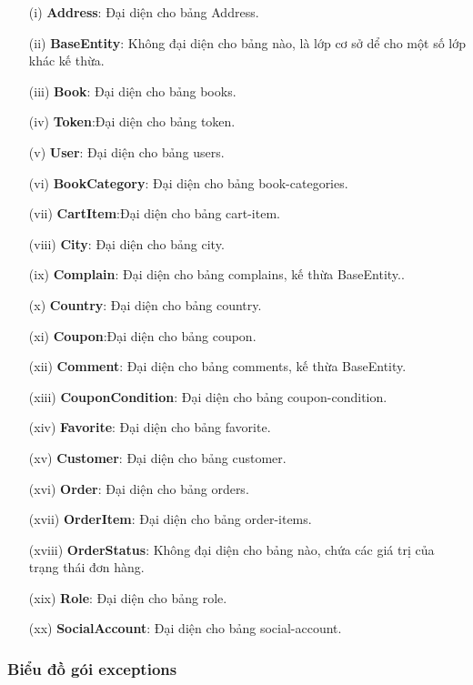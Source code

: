 \documentclass[../DoAn.tex]{subfiles}
\begin{document}
\begin{enumerate}
    \item [(i)] \textbf{Address}: Đại diện cho bảng Address.
    \item [(ii)]\textbf{BaseEntity}: Không đại diện cho bảng nào, là lớp cơ sở dể cho một số lớp khác kế thừa.
    \item[(iii)] \textbf{Book}: Đại diện cho bảng books.
    \item[(iv)] \textbf{Token}:Đại diện cho bảng token.
    \item[(v)] \textbf{User}: Đại diện cho bảng users.
    \item[(vi)] \textbf{BookCategory}: Đại diện cho bảng book-categories.
    \item[(vii)] \textbf{CartItem}:Đại diện cho bảng cart-item.
    \item[(viii)] \textbf{City}: Đại diện cho bảng city.
    \item[(ix)] \textbf{Complain}: Đại diện cho bảng complains, kế thừa BaseEntity..
    \item[(x)] \textbf{Country}: Đại diện cho bảng country.
    \item[(xi)] \textbf{Coupon}:Đại diện cho bảng coupon.
    \item[(xii)] \textbf{Comment}: Đại diện cho bảng comments, kế thừa BaseEntity.
    \item [(xiii)] \textbf{CouponCondition}: Đại diện cho bảng coupon-condition.
    \item[(xiv)] \textbf{Favorite}: Đại diện cho bảng favorite.
    \item[(xv)] \textbf{Customer}: Đại diện cho bảng customer.
    \item[(xvi)] \textbf{Order}: Đại diện cho bảng orders.
    \item[(xvii)] \textbf{OrderItem}: Đại diện cho bảng order-items.
    \item[(xviii)] \textbf{OrderStatus}: Không đại diện cho bảng nào, chứa các giá trị của trạng thái đơn hàng.
    \item[(xix)] \textbf{Role}: Đại diện cho bảng role.
    \item[(xx)] \textbf{SocialAccount}: Đại diện cho bảng social-account.
\end{enumerate}

\subsubsection{Biểu đồ gói exceptions}
\end{document}
